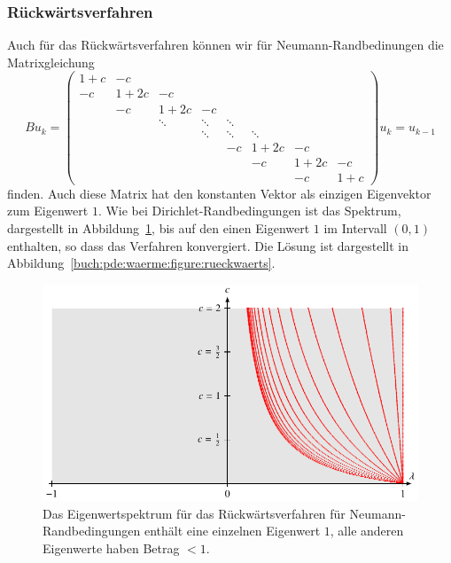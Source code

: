 \subsubsection{Rückwärtsverfahren}
Auch für das Rückwärtsverfahren können wir für Neumann-Randbedinungen
die Matrixgleichung
\begin{equation}
Bu_k
=
\begin{pmatrix}
 1+c & -c   &      &      &      &      &      &     \\
 -c  & 1+2c & -c   &      &      &      &      &     \\
     &  -c  & 1+2c & -c   &      &      &      &     \\
     &      &\ddots&\ddots&\ddots&      &      &     \\
     &      &      &\ddots&\ddots&\ddots&      &     \\
     &      &      &      &  -c  & 1+2c & -c   &     \\
     &      &      &      &      &  -c  & 1+2c & -c  \\
     &      &      &      &      &      &  -c  & 1+c 
\end{pmatrix}
u_k
=
u_{k-1}
\end{equation}
finden.
Auch diese Matrix hat den konstanten Vektor als einzigen Eigenvektor
zum Eigenwert $1$.
Wie bei Dirichlet-Randbedingungen ist das Spektrum, dargestellt in
Abbildung~\ref{buch:pde:waerme:implizit:neumannspektrum}, bis auf den
einen Eigenwert $1$ im Intervall $(0,1)$ enthalten, so dass das
Verfahren konvergiert.
Die Lösung ist dargestellt in
Abbildung~\ref{buch:pde:waerme:figure:rueckwaerts}.
\begin{figure}
\centering
\includegraphics{chapters/70-pde/images/implizitneumann.pdf}
\caption{Das Eigenwertspektrum für das Rückwärtsverfahren für
Neumann-Randbedingungen enthält eine einzelnen Eigenwert $1$, alle
anderen Eigenwerte haben Betrag $<1$.
\label{buch:pde:waerme:implizit:neumannspektrum}}
\end{figure}
